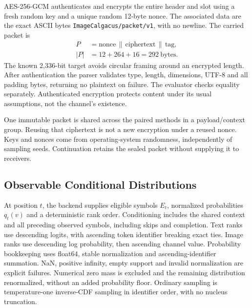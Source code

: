 AES-256-GCM \cite{gcm} authenticates and encrypts the entire header and slot using a fresh random key and a unique random 12-byte nonce. The associated data are the exact ASCII bytes \texttt{ImageCalgacus/packet/v1}, with no newline. The carried packet is
\begin{equation}
\begin{aligned}
P&=\text{nonce}\,\|\,\text{ciphertext}\,\|\,\text{tag},\\
|P|&=12+264+16=292\ \text{bytes}.
\end{aligned}
\label{eq:packet}
\end{equation}
The known 2,336-bit target avoids circular framing around an encrypted length. After authentication the parser validates type, length, dimensions, UTF-8 and all padding bytes, returning no plaintext on failure. The evaluator checks equality separately. Authenticated encryption protects content under its usual assumptions, not the channel's existence.

One immutable packet is shared across the paired methods in a payload/context group. Reusing that ciphertext is not a new encryption under a reused nonce. Keys and nonces come from operating-system randomness, independently of sampling seeds. Continuation retains the sealed packet without supplying it to receivers.

\subsection{Observable Conditional Distributions}
At position $t$, the backend supplies eligible symbols $E_t$, normalized probabilities $q_t(v)$ and a deterministic rank order. Conditioning includes the shared context and all preceding observed symbols, including skips and completion. Text ranks use descending logits, with ascending token identifier breaking exact ties. Image ranks use descending log probability, then ascending channel value. Probability bookkeeping uses float64, stable normalization and ascending-identifier summation. NaN, positive infinity, empty support and invalid normalization are explicit failures. Numerical zero mass is excluded and the remaining distribution renormalized, without an added probability floor. Ordinary sampling is temperature-one inverse-CDF sampling in identifier order, with no nucleus truncation.

